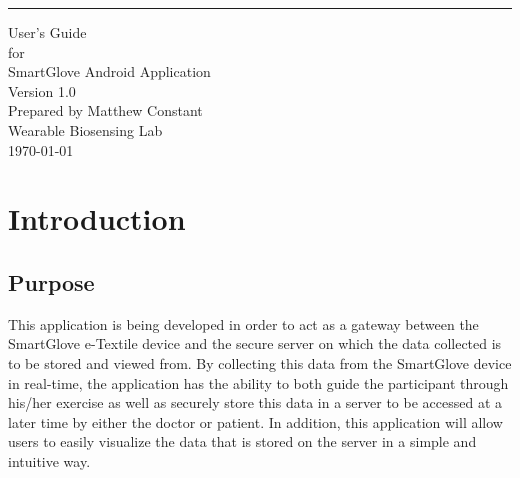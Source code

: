 \documentclass{scrreprt}
\date{}
\def\myversion{1.0 }
\begin{document}
\begin{flushright}
    \rule{16cm}{5pt}\vskip1cm
    \begin{bfseries}
        \Huge{User's Guide}\\
        \vspace{1.9cm}
        for\\
        \vspace{1.9cm}
        SmartGlove Android Application\\
        \vspace{1.9cm}
        \LARGE{Version \myversion}\\
        \vspace{1.9cm}
        Prepared by Matthew Constant\\
        \vspace{1.9cm}
       Wearable Biosensing Lab\\
        \vspace{1.9cm}
        \today\\
    \end{bfseries}
\end{flushright}

\tableofcontents




\chapter{Introduction}

\section{Purpose}
This application is being developed in order to act as a gateway between the SmartGlove
e-Textile device and the secure server on which the data collected is to be stored and
viewed from. By collecting this data from the SmartGlove device in real-time, the application
has the ability to both guide the participant through his/her exercise as well as securely store
this data in a server to be accessed at a later time by either the doctor or patient. In 
addition, this application will allow users to easily visualize the data that is stored on the 
server in a simple and intuitive way.
\end{document}
